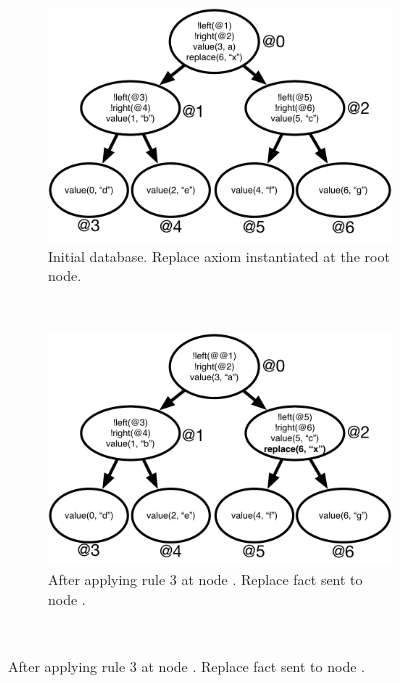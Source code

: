 \begin{figure}[h]
        \centering
        \begin{subfigure}[b]{0.5\textwidth}
                \includegraphics[width=\textwidth]{figures/btree/btree_trace1}
                \caption{Initial database. Replace axiom instantiated at the
                    root node.}
                \label{fig:btree_trace1}
        \end{subfigure}%
        ~
        \begin{subfigure}[b]{0.5\textwidth}
                \includegraphics[width=\textwidth]{figures/btree/btree_trace2}
                \caption{After applying rule 3 at node . Replace fact
                   sent to node .}
                \label{fig:btree_trace2}
        \end{subfigure}\\

\end{figure}
